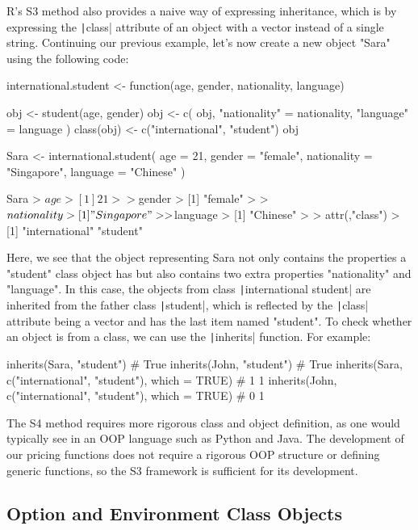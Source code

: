 R's S3 method also provides a naive way of expressing inheritance, which is by expressing the \texttt|class| attribute of an object with a vector instead of a single string. Continuing our previous example, let's now create a new object "Sara" using the following code:

\begin{Rminted}
international.student <- function(age, gender, nationality, language) {
    
    obj <- student(age, gender)
    obj <- c(
        obj,
        "nationality" = nationality,
        "language" = language
    )
    class(obj) <- c("international", "student")
    obj
}

Sara <- international.student(
    age = 21,
    gender = "female",
    nationality = "Singapore",
    language = "Chinese"
)

Sara
> $age
> [1] 21
> 
> $gender
> [1] "female"
> 
> $nationality
> [1] "Singapore"
> 
> $language
> [1] "Chinese"
> 
> attr(,"class")
> [1] "international" "student"    
\end{Rminted}

Here, we see that the object representing Sara not only contains the properties a "student" class object has but also contains two extra properties "nationality" and "language". In this case, the objects from class \texttt|international student| are inherited from the father class \texttt|student|, which is reflected by the \texttt|class| attribute being a vector and has the last item named "student". To check whether an object is from a class, we can use the \texttt|inherits| function. For example:

\begin{Rminted}
inherits(Sara, "student") # True
inherits(John, "student") # True
inherits(Sara, c("international", "student"), which = TRUE) # 1 1
inherits(John, c("international", "student"), which = TRUE) # 0 1
\end{Rminted}

The S4 method requires more rigorous class and object definition, as one would typically see in an OOP language such as Python and Java. The development of our pricing functions does not require a rigorous OOP structure or defining generic functions, so the S3 framework is sufficient for its development.

\subsection{Option and Environment Class Objects}

